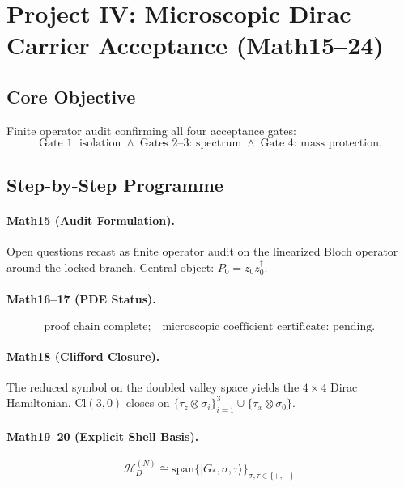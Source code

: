\documentclass[11pt,a4paper]{article}
\newcommand{\Gstar}{G_{*}}
\begin{document}
\section{Project IV: Microscopic Dirac Carrier Acceptance (Math15--24)}

\subsection{Core Objective}
Finite operator audit confirming all four acceptance gates:
\begin{equation}
\boxed{
\text{Gate 1: isolation}
\;\wedge\;
\text{Gates 2--3: spectrum}
\;\wedge\;
\text{Gate 4: mass protection.}
}
\end{equation}

\subsection{Step-by-Step Programme}

\paragraph{Math15 (Audit Formulation).}
Open questions recast as finite operator audit on the linearized Bloch
operator around the locked branch. Central object: $P_{0}=z_{0}z_{0}^{\dagger}$.

\paragraph{Math16--17 (PDE Status).}
\begin{equation}
\boxed{\text{proof chain complete};\quad
\text{microscopic coefficient certificate: pending.}}
\end{equation}

\paragraph{Math18 (Clifford Closure).}
The reduced symbol on the doubled valley space yields the $4\times4$ Dirac
Hamiltonian. $\mathrm{Cl}(3,0)$ closes on $\{\tau_{z}\otimes\sigma_{i}\}_{i=1}^{3}\cup\{\tau_{x}\otimes\sigma_{0}\}$.

\paragraph{Math19--20 (Explicit Shell Basis).}
\begin{equation}
\mathcal{H}_{D}^{(N)}\cong
\mathrm{span}\bigl\{|\Gstar,\sigma,\tau\rangle\bigr\}_{\sigma,\tau\in\{+,-\}}.
\end{equation}
\end{document}
